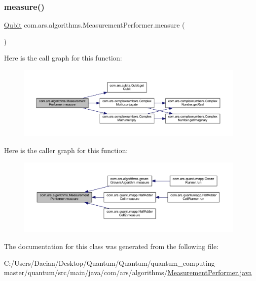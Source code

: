 \subsubsection{\texorpdfstring{measure()}{measure()}}
{\footnotesize\ttfamily \hyperlink{classcom_1_1ars_1_1qubits_1_1_qubit}{Qubit} com.\+ars.\+algorithms.\+Measurement\+Performer.\+measure (\begin{DoxyParamCaption}{ }\end{DoxyParamCaption})}

Here is the call graph for this function\+:
\nopagebreak
\begin{figure}[H]
\begin{center}
\leavevmode
\includegraphics[width=350pt]{classcom_1_1ars_1_1algorithms_1_1_measurement_performer_aaa613379c40e0b083f5ce81e6ba59f72_cgraph}
\end{center}
\end{figure}
Here is the caller graph for this function\+:
\nopagebreak
\begin{figure}[H]
\begin{center}
\leavevmode
\includegraphics[width=350pt]{classcom_1_1ars_1_1algorithms_1_1_measurement_performer_aaa613379c40e0b083f5ce81e6ba59f72_icgraph}
\end{center}
\end{figure}


The documentation for this class was generated from the following file\+:\begin{DoxyCompactItemize}
\item 
C\+:/\+Users/\+Dacian/\+Desktop/\+Quantum/\+Quantum/quantum\+\_\+computing-\/master/quantum/src/main/java/com/ars/algorithms/\hyperlink{_measurement_performer_8java}{Measurement\+Performer.\+java}\end{DoxyCompactItemize}
